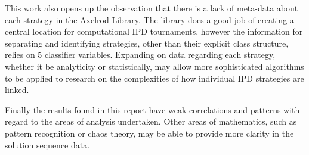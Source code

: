 This work also opens up the observation that there is a lack of meta-data about each strategy in the Axelrod Library.
The library does a good job of creating a central location for computational IPD tournaments, however the information for separating and identifying strategies, other than their explicit class structure, relies on 5 classifier variables.
Expanding on data regarding each strategy, whether it be analyticity or statistically, may allow more sophisticated algorithms to be applied to research on the complexities of how individual IPD strategies are linked.

Finally the results found in this report have weak correlations and patterns with regard to the areas of analysis undertaken.
Other areas of mathematics, such as pattern recognition or chaos theory, may be able to provide more clarity in the solution sequence data. 